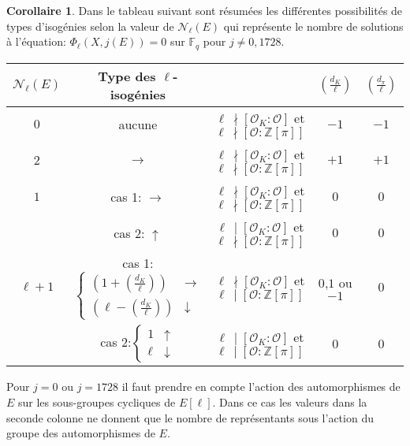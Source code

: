 \documentclass[10pt,a4paper]{book}
\theoremstyle{plain}
\theoremstyle{definition}
\theoremstyle{definition}
\theoremstyle{definition}
\newtheorem{cor}[thm]{Corollaire}
\theoremstyle{definition}
\theoremstyle{definition}
\theoremstyle{remark}
\theoremstyle{remark}
\theoremstyle{definition}
\begin{document}
\begin{cor}
\label{cor:tab:vol} 
Dans le tableau suivant sont résumées les différentes possibilités de types d'isogénies selon la valeur de $\mathcal{N}_{\ell}(E)$ qui représente le nombre de solutions à l'équation: $\Phi_{\ell}(X,j(E))=0$ sur $\mathbb{F}_q$ pour $j\neq 0, 1728$.
\newline
\begin{tabular}{|c|c|c|c|c|}
\hline 
$\mathcal{N}_{\ell}(E)$ & Type des $\ell$-isogénies &  & $\left(\frac{d_K}{\ell}\right)$ & $\left(\frac{d_{\pi}}{\ell}\right)$\tabularnewline
\hline 
\hline 
$0$ & aucune & $\ell \,\nmid[\mathcal{O}_{K}:\mathcal{O}]$ et $\ell \,\nmid[\mathcal{O}:\mathbb{Z}[\pi]]$  & $-1$ & $-1$\\
\hline 
$2$ & $\rightarrow$ & $\ell \,\nmid[\mathcal{O}_{K}:\mathcal{O}]$ et $\ell \,\nmid[\mathcal{O}:\mathbb{Z}[\pi]]$  & $+1$ & $+1$\\
\hline 
$1$ & cas 1: $\rightarrow$ & $\ell\,\nmid[\mathcal{O}_{K}:\mathcal{O}]$ et $\ell\,\nmid[\mathcal{O}:\mathbb{Z}[\pi]]$  & $0$ & $0$\\

\cline{2-5} & cas 2: $\uparrow$ & $\ell\,\mid[\mathcal{O}_{K}:\mathcal{O}]$ et $\ell\,\nmid[\mathcal{O}:\mathbb{Z}[\pi]]$  & $0$ & $0$\\
\hline 
$\ell+1$ & cas 1:$\left\{ \begin{array}{cc}
(1+\left(\frac{d_K}{\ell}\right))& \rightarrow\\
(\ell-\left(\frac{d_K}{\ell}\right)) & \downarrow
\end{array}\right.$ & $\ell \,\nmid[\mathcal{O}_{K}:\mathcal{O}]$ et $\ell \,\mid[\mathcal{O}:\mathbb{Z}[\pi]]$  & $0$,$1$ ou $-1$ & $0$\\
 
\cline{2-5} & cas 2:$\left\{ \begin{array}{cc}
1 & \uparrow\\
\ell & \downarrow
\end{array}\right.$ & $\ell \,\mid[\mathcal{O}_{K}:\mathcal{O}]$ et $\ell \,\mid[\mathcal{O}:\mathbb{Z}[\pi]]$  & $0$ & $0$ \\
\hline 
\end{tabular}
Pour $j=0$ ou $j=1728$ il faut prendre en compte l'action des automorphismes de
$E$ sur les sous-groupes cycliques de $E[\ell]$. Dans ce cas
 les valeurs dans la seconde colonne ne donnent que le nombre 
de représentants sous l'action du groupe des automorphismes de $E$.
\end{cor}
\end{document}
